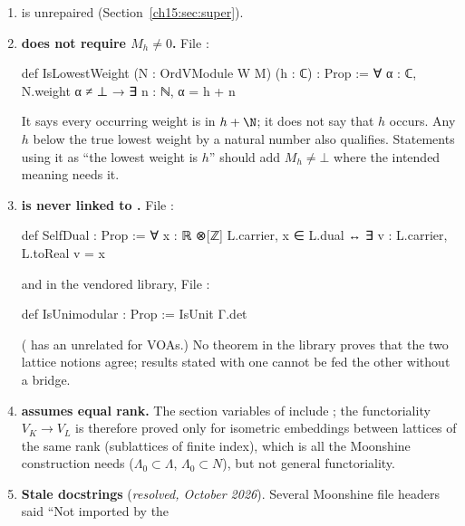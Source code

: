 \begin{enumerate}
  $\rho\in\C/\Z$, of the spaces $K_\rho$ of solutions supported on $\rho$, and the shift by $c$ maps
  $K_\rho$ isomorphically onto $K_{\rho+c}$. Either every $K_\rho$ is $0$ (and the space is $0$) or
  all of the uncountably many $K_\rho$ are nonzero (and the space is infinite-dimensional). Mathlib's
   is $0$ for infinite-dimensional spaces, so in both cases
   is $0$. So  is not the fusion rule
  $N^P_{MN}$.
\item \textbf{} is unrepaired (Section~\ref{ch15:sec:super}).
\item \textbf{ does not require $M_h\ne0$.} File
  :
\begin{leancode}
def IsLowestWeight (N : OrdVModule W M) (h : ℂ) : Prop :=
  ∀ α : ℂ, N.weight α ≠ ⊥ → ∃ n : ℕ, α = h + n
\end{leancode}
  It says every occurring weight is in $h+\N$; it does not say that $h$ occurs. Any $h$ below the
  true lowest weight by a natural number also qualifies. Statements using it as ``the lowest weight
  is $h$'' should add $M_h\ne\bot$ where the intended meaning needs it.
\item \textbf{ is never linked to .} File
  :
\begin{leancode}
def SelfDual : Prop := ∀ x : ℝ ⊗[ℤ] L.carrier, x ∈ L.dual ↔ ∃ v : L.carrier, L.toReal v = x
\end{leancode}
  and in the vendored library, File :
\begin{leancode}
def IsUnimodular : Prop := IsUnit Γ.det
\end{leancode}
  ( has an unrelated  for VOAs.) No theorem in the
  library proves that the two lattice notions agree; results stated with one cannot be fed the other
  without a bridge.
\item \textbf{ assumes equal rank.} The section variables of
   include ; the
  functoriality $V_K\to V_L$ is therefore proved only for isometric embeddings between lattices of the
  same rank (sublattices of finite index), which is all the Moonshine construction needs
  ($\Lambda_0\subset\Lambda$, $\Lambda_0\subset N$), but not general functoriality.
\item \textbf{Stale docstrings} (\emph{resolved, October 2026}). Several Moonshine file headers said ``Not imported by the

\end{enumerate}
